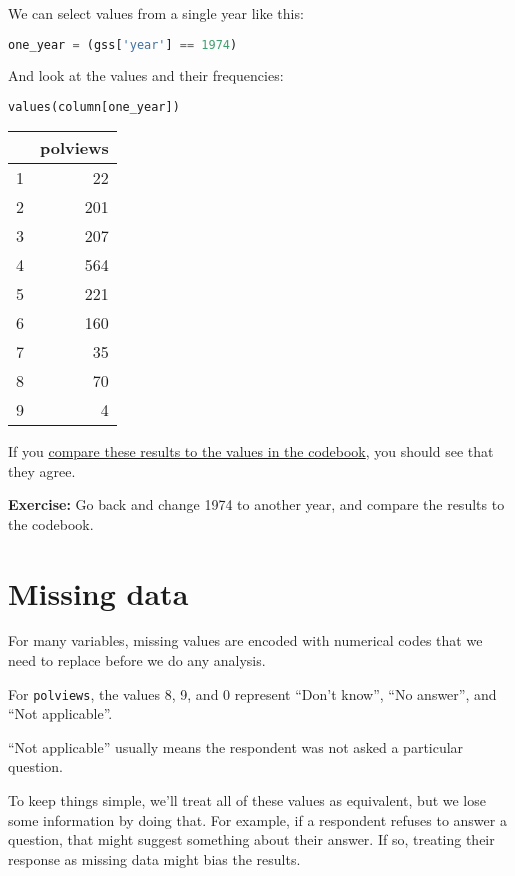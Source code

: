 We can select values from a single year like this:

\begin{lstlisting}[language=Python]
one_year = (gss['year'] == 1974)
\end{lstlisting}

And look at the values and their frequencies:

\begin{lstlisting}[language=Python]
values(column[one_year])
\end{lstlisting}

\begin{tabular}{lr}
\toprule
{} &  polviews \\
\midrule
1 &        22 \\
2 &       201 \\
3 &       207 \\
4 &       564 \\
5 &       221 \\
6 &       160 \\
7 &        35 \\
8 &        70 \\
9 &         4 \\
\bottomrule
\end{tabular}

If you
\href{https://gssdataexplorer.norc.org/projects/52787/variables/178/vshow}{compare
these results to the values in the codebook}, you should see that they
agree.

\textbf{Exercise:} Go back and change 1974 to another year, and compare
the results to the codebook.

\hypertarget{missing-data}{%
\section{Missing data}\label{missing-data}}

For many variables, missing values are encoded with numerical codes that
we need to replace before we do any analysis.

For \passthrough{\lstinline!polviews!}, the values 8, 9, and 0 represent
``Don't know'', ``No answer'', and ``Not applicable''.

``Not applicable'' usually means the respondent was not asked a
particular question.

To keep things simple, we'll treat all of these values as equivalent,
but we lose some information by doing that. For example, if a respondent
refuses to answer a question, that might suggest something about their
answer. If so, treating their response as missing data might bias the
results.

